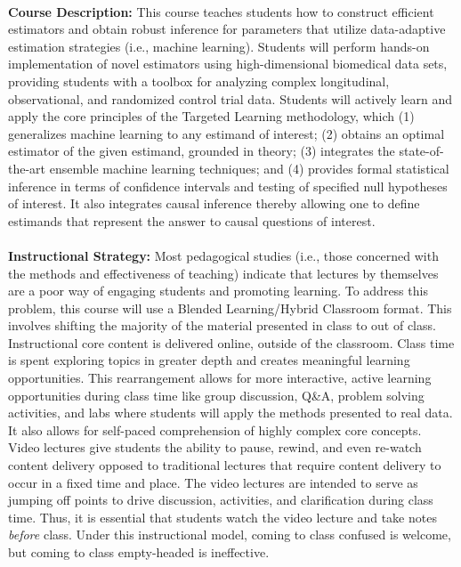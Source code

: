 \documentclass[11pt]{article}
\begin{document}
\textbf {\large \\ Course Description:}
This course teaches students how to construct efficient estimators and obtain
robust inference for parameters that utilize data-adaptive estimation
strategies (i.e., machine learning). Students will perform hands-on
implementation of novel estimators using high-dimensional biomedical data sets,
providing students with a toolbox for analyzing complex longitudinal,
observational, and randomized control trial data. Students will actively learn
and apply the core principles of the Targeted Learning methodology, which (1)
generalizes machine learning to any estimand of interest; (2) obtains an optimal
estimator of the given estimand, grounded in theory; (3) integrates the
state-of-the-art ensemble machine learning techniques; and (4) provides formal
statistical inference in terms of confidence intervals and testing of specified
null hypotheses of interest. It also integrates causal inference thereby
allowing one to define estimands that represent the answer to causal questions
of interest. \\

\textbf {\large \\ Instructional Strategy:}
Most pedagogical studies (i.e., those concerned with the methods and
effectiveness of teaching) indicate that lectures by themselves are a poor way
of engaging students and promoting learning. To address this problem, this
course will use a Blended Learning/Hybrid Classroom format. This involves
shifting the majority of the material presented in class to out of class.
Instructional core content is delivered online, outside of the classroom. Class
time is spent exploring topics in greater depth and creates meaningful learning
opportunities. This rearrangement allows for more interactive, active learning
opportunities during class time like group discussion, Q\&A, problem solving
activities, and labs where students will apply the methods presented to real
data. It also allows for self-paced comprehension of highly complex core
concepts. Video lectures give students the ability to pause, rewind, and even
re-watch content delivery opposed to traditional lectures that require content
delivery to occur in a fixed time and place. The video lectures are intended to
serve as jumping off points to drive discussion, activities, and clarification
during class time. Thus, it is essential that students watch the video lecture
and take notes \textit{before} class. Under this instructional model, coming to
class confused is welcome, but coming to class empty-headed is ineffective. \\
\end{document}
